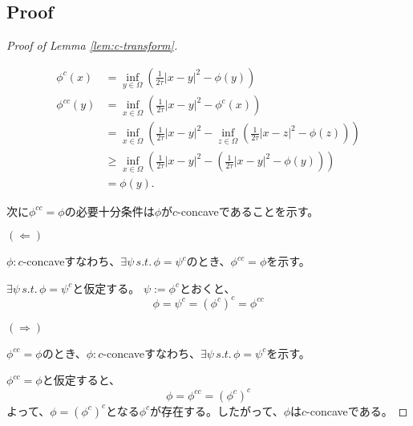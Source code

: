 \documentclass{jsarticle}
\theoremstyle{definition}
\begin{document}
\subsection*{Proof}

\begin{proof}[Proof of Lemma \ref{lem:c-transform}]
    \hypertarget{proof:lem:c-transform}{}
    \begin{align*}
        \phi^c(x)    &= \inf_{y\in\Omega} \left(\frac{1}{2 \tau}|x - y|^2 - \phi(y)\right)\\
        \phi^{cc}(y) &= \inf_{x\in\Omega} \left(\frac{1}{2 \tau}|x - y|^2 - \phi^c(x)\right)\\
                  &= \inf_{x\in\Omega} \left(\frac{1}{2 \tau}|x - y|^2 - \inf_{z\in\Omega} \left(\frac{1}{2 \tau}|x - z|^2 - \phi(z)\right)\right)\\
                  &\ge  \inf_{x\in\Omega} \left(\frac{1}{2 \tau}|x - y|^2 - \left(\frac{1}{2 \tau}|x - y|^2 - \phi(y)\right)\right)\\
                  &= \phi(y).
    \end{align*}

    次に$\phi^{cc} = \phi$の必要十分条件は$\phi$が$c$-concaveであることを示す。

    $(\Leftarrow)$

    $\phi: c$-concaveすなわち、$\exists \psi \, s.t. \, \phi = \psi^c$のとき、$\phi^{cc} = \phi$を示す。

    $\exists \psi \, s.t. \, \phi = \psi^c$と仮定する。
    $\psi := \phi^c$とおくと、
    $$
    \phi = \psi^c = (\phi^c)^c= \phi^{cc}
    $$

    $(\Rightarrow)$

    $\phi^{cc} = \phi$のとき、$\phi: c$-concaveすなわち、$\exists \psi \, s.t. \, \phi = \psi^c$を示す。

    $\phi^{cc} = \phi$と仮定すると、
    $$
    \phi = \phi^{cc} = (\phi^c)^c
    $$
    よって、$\phi = (\phi^c)^c$となる$\phi^c$が存在する。したがって、$\phi$は$c$-concaveである。



\end{proof}
\end{document}
